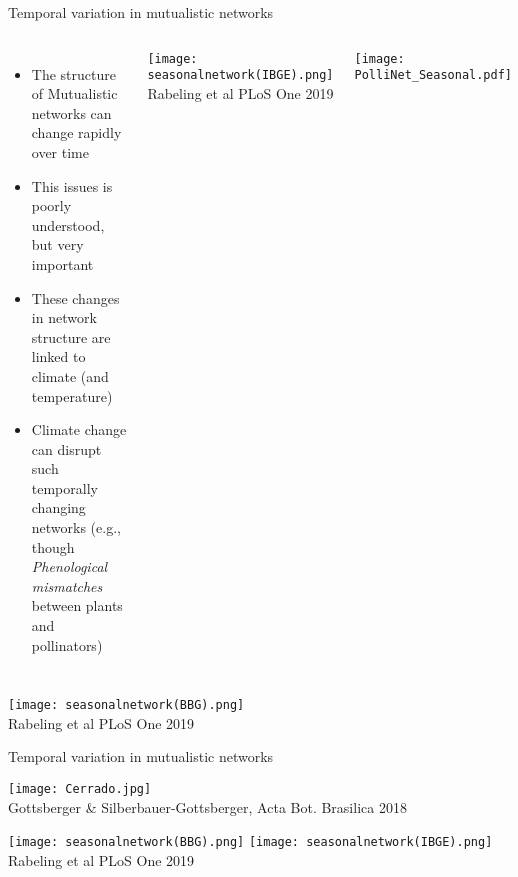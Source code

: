 \begin{frame}{Temporal variation in mutualistic networks}
  
  \begin{columns}[c]
      \begin{itemize}[<+->]\setlength{\itemindent}{0em}\itemsep6pt
        \item The structure of Mutualistic networks can change rapidly over time
        \item This issues is poorly understood, but very important
        \item These changes in network structure are linked to climate (and temperature)
        \item Climate change can disrupt such temporally changing networks (e.g., though {\it Phenological mismatches} between plants and pollinators)  
      \end{itemize}
      \pause
      \begin{center}
        \texttt{[image: seasonalnetwork(IBGE).png]}\\\tiny Rabeling et al PLoS One 2019  
      \end{center}    
      \centering
    \texttt{[image: PolliNet\_Seasonal.pdf]}
  \end{columns}
\pause
\begin{center}
  \texttt{[image: seasonalnetwork(BBG).png]}\\ 
  \tiny Rabeling et al PLoS One 2019  
\end{center}
\end{frame}

\begin{frame}{Temporal variation in mutualistic networks}
  
\begin{center}
  \texttt{[image: Cerrado.jpg]}\\ \tiny Gottsberger \& Silberbauer-Gottsberger, Acta Bot. Brasilica 2018  
\end{center}
\begin{center}
  \texttt{[image: seasonalnetwork(BBG).png]}
  \texttt{[image: seasonalnetwork(IBGE).png]}\\\tiny Rabeling et al PLoS One 2019  
\end{center}

\end{frame}

